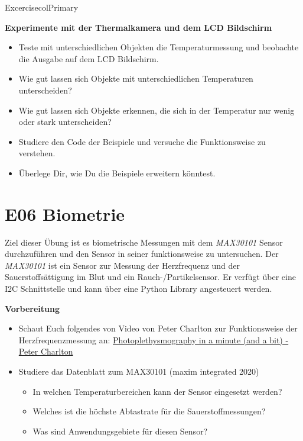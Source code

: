 \documentclass[
  11pt,
  a4paper,
  oneside, openany  ,captions=tableheading
]{scrbook}
\providecommand{\tightlist}{%
  \setlength{\itemsep}{0pt}\setlength{\parskip}{0pt}}
\theoremstyle{remark}
\begin{document}
\begin{boxtitle}{Excercise}{colPrimary}

\textbf{Experimente mit der Thermalkamera und dem LCD Bildschirm}

\begin{itemize}
\tightlist
\item
  Teste mit unterschiedlichen Objekten die Temperaturmessung und
  beobachte die Ausgabe auf dem LCD Bildschirm.
\item
  Wie gut lassen sich Objekte mit unterschiedlichen Temperaturen
  unterscheiden?
\item
  Wie gut lassen sich Objekte erkennen, die sich in der Temperatur nur
  wenig oder stark unterscheiden?
\item
  Studiere den Code der Beispiele und versuche die Funktionsweise zu
  verstehen.
\item
  Überlege Dir, wie Du die Beispiele erweitern könntest.
\end{itemize}

\end{boxtitle}

\chapter*{E06 Biometrie}\label{e06-biometrie}


Ziel dieser Übung ist es biometrische Messungen mit dem \emph{MAX30101}
Sensor durchzuführen und den Sensor in seiner funktionsweise zu
untersuchen. Der \emph{MAX30101} ist ein Sensor zur Messung der
Herzfrequenz und der Sauerstoffsättigung im Blut und ein
Rauch-/Partikelsensor. Er verfügt über eine I2C Schnittstelle und kann
über eine Python Library angesteuert werden.

\textbf{Vorbereitung}

\begin{itemize}
\tightlist
\item
  Schaut Euch folgendes von Video von Peter Charlton zur Funktionsweise
  der Herzfrequenzmessung an:
  \href{https://www.youtube.com/embed/HnXDvN4WNX8?si=EeIAlSWW2Z1SJBof}{Photoplethysmography
  in a minute (and a bit) - Peter Charlton}
\item
  Studiere das Datenblatt zum MAX30101 (maxim integrated 2020)

  \begin{itemize}
  \tightlist
  \item
    In welchen Temperaturbereichen kann der Sensor eingesetzt werden?
  \item
    Welches ist die höchste Abtastrate für die Sauerstoffmessungen?
  \item
    Was sind Anwendungsgebiete für diesen Sensor?
  \end{itemize}
\end{itemize}
\end{document}
